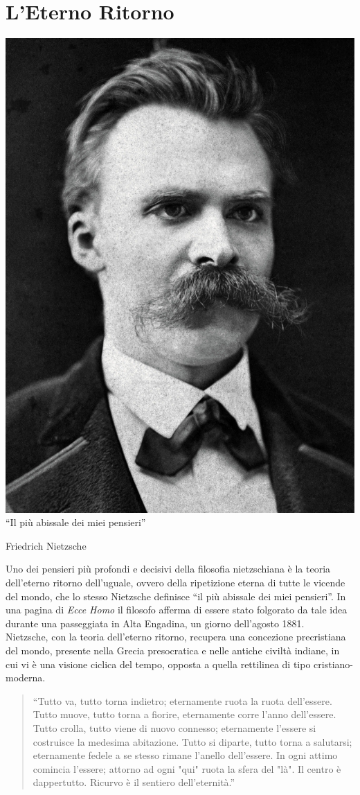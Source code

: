 \documentclass[10pt]{report}
\begin{document}
	\chapter{L'Eterno Ritorno}
		\epigraph{\includegraphics[width=0.7\linewidth]{Nietzsche/Nietzsche187a}\\ ``Il più abissale dei miei pensieri''}{Friedrich Nietzsche}
		Uno dei pensieri più profondi e decisivi della filosofia nietzschiana è la teoria dell'eterno ritorno dell'uguale, ovvero della ripetizione eterna di tutte le vicende del mondo, che lo stesso Nietzsche definisce ``il più abissale dei miei pensieri''. In una pagina di \textit{Ecce Homo} il filosofo afferma di essere stato folgorato da tale idea durante una passeggiata in Alta Engadina, un giorno dell'agosto 1881.\\
		Nietzsche, con la teoria dell'eterno ritorno, recupera una concezione precristiana del mondo, presente nella Grecia presocratica e nelle antiche civiltà indiane, in cui vi è una visione ciclica del tempo, opposta a quella rettilinea di tipo cristiano-moderna.
		\begin{quotation}
			``Tutto va, tutto torna indietro; eternamente ruota la ruota dell'essere. Tutto muove, tutto torna a fiorire, eternamente corre l'anno dell'essere. Tutto crolla, tutto viene di nuovo connesso; eternamente l'essere si costruisce la medesima abitazione. Tutto si diparte, tutto torna a salutarsi; eternamente fedele a se stesso rimane l'anello dell'essere. In ogni attimo comincia l'essere; attorno ad ogni "qui" ruota la sfera del "là". Il centro è dappertutto. Ricurvo è il sentiero dell'eternità.''
		\end{quotation}
\end{document}
